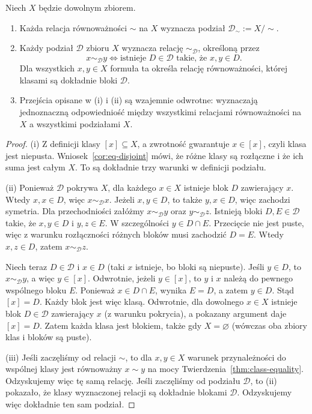 \begin{twierdzenie}\label{thm:eq-partition}
Niech $X$ będzie dowolnym zbiorem.
\begin{enumerate}[label=(\roman*)]
\item Każda relacja równoważności $\sim$ na $X$ wyznacza
podział $\mathcal D_{\sim}:=X/{\sim}$.
\item Każdy podział $\mathcal D$ zbioru $X$ wyznacza relację
$\sim_{\mathcal D}$, określoną przez
\[
 x\sim_{\mathcal D}y\iff
 \text{istnieje }D\in\mathcal D\text{ takie, że }x,y\in D.
\]
Dla wszystkich $x,y\in X$ formuła ta określa relację
równoważności, której klasami są dokładnie bloki $\mathcal D$.
\item Przejścia opisane w (i) i (ii) są wzajemnie odwrotne:
wyznaczają jednoznaczną odpowiedniość między wszystkimi
relacjami równoważności na $X$ a wszystkimi podziałami $X$.
\end{enumerate}
\end{twierdzenie}
\begin{proof}
(i) Z definicji klasy $[x]\subseteq X$, a zwrotność
gwarantuje $x\in[x]$, czyli klasa jest niepusta.
Wniosek~\ref{cor:eq-disjoint} mówi, że różne klasy są rozłączne
i że ich suma jest całym $X$. To są dokładnie trzy warunki
w definicji podziału.

(ii) Ponieważ $\mathcal D$ pokrywa $X$, dla każdego
$x\in X$ istnieje blok $D$ zawierający $x$.
Wtedy $x,x\in D$, więc $x\sim_{\mathcal D}x$.
Jeżeli $x,y\in D$, to także $y,x\in D$, więc zachodzi
symetria. Dla przechodniości załóżmy
$x\sim_{\mathcal D}y$ oraz $y\sim_{\mathcal D}z$.
Istnieją bloki $D,E\in\mathcal D$ takie, że
$x,y\in D$ i $y,z\in E$. W szczególności $y\in D\cap E$.
Przecięcie nie jest puste, więc z warunku rozłączności
różnych bloków musi zachodzić $D=E$. Wtedy $x,z\in D$,
zatem $x\sim_{\mathcal D}z$.

Niech teraz $D\in\mathcal D$ i $x\in D$ (taki $x$
istnieje, bo bloki są niepuste). Jeśli $y\in D$, to
$x\sim_{\mathcal D}y$, a więc $y\in[x]$.
Odwrotnie, jeżeli $y\in[x]$, to $y$ i $x$ należą do
pewnego wspólnego bloku $E$. Ponieważ $x\in D\cap E$,
wynika $E=D$, a zatem $y\in D$. Stąd $[x]=D$.
Każdy blok jest więc klasą. Odwrotnie, dla dowolnego
$x\in X$ istnieje blok $D\in\mathcal D$ zawierający $x$
(z warunku pokrycia), a pokazany argument daje $[x]=D$.
Zatem każda klasa jest blokiem, także gdy $X=\varnothing$
(wówczas oba zbiory klas i bloków są puste).

(iii) Jeśli zaczęliśmy od relacji $\sim$, to dla
$x,y\in X$ warunek przynależności do wspólnej klasy
jest równoważny $x\sim y$ na mocy
Twierdzenia~\ref{thm:class-equality}.
Odzyskujemy więc tę samą relację. Jeśli zaczęliśmy
od podziału $\mathcal D$, to (ii) pokazało, że klasy
wyznaczonej relacji są dokładnie blokami $\mathcal D$.
Odzyskujemy więc dokładnie ten sam podział.
\end{proof}

